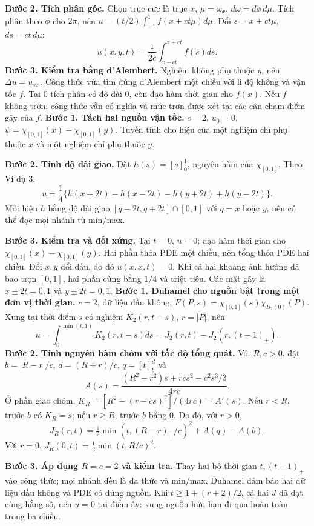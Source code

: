 \textbf{Bước 2. Tích phân góc.} Chọn trục cực là trục $x$, $\mu=\omega_x$, $d\omega=d\phi\,d\mu$. Tích phân theo $\phi$ cho $2\pi$, nên $u=(t/2)\int_{-1}^1f(x+ct\mu)d\mu$. Đổi $s=x+ct\mu$, $ds=ct\,d\mu$:
\[u(x,y,t)=\frac1{2c}\int_{x-ct}^{x+ct}f(s)ds.\]
\textbf{Bước 3. Kiểm tra bằng d'Alembert.} Nghiệm không phụ thuộc $y$, nên $\Delta u=u_{xx}$. Công thức vừa tìm đúng d'Alembert một chiều với li độ không và vận tốc $f$. Tại $0$ tích phân có độ dài $0$, còn đạo hàm thời gian cho $f(x)$. Nếu $f$ không trơn, công thức vẫn có nghĩa và mức trơn được xét tại các cận chạm điểm gãy của $f$.
\textbf{Bước 1. Tách hai nguồn vận tốc.} $c=2$, $u_0=0$, $\psi=\chi_{[0,1]}(x)-\chi_{[0,1]}(y)$. Tuyến tính cho hiệu của một nghiệm chỉ phụ thuộc $x$ và một nghiệm chỉ phụ thuộc $y$.

\textbf{Bước 2. Tính độ dài giao.} Đặt $h(s)=[s]_0^1$, nguyên hàm của $\chi_{[0,1]}$. Theo Ví dụ 3,
\[u=\frac14\{h(x+2t)-h(x-2t)-h(y+2t)+h(y-2t)\}.\]
Mỗi hiệu $h$ bằng độ dài giao $[q-2t,q+2t]\cap[0,1]$ với $q=x$ hoặc $y$, nên có thể đọc mọi nhánh từ min/max.

\textbf{Bước 3. Kiểm tra và đối xứng.} Tại $t=0$, $u=0$; đạo hàm thời gian cho $\chi_{[0,1]}(x)-\chi_{[0,1]}(y)$. Hai phần thỏa PDE một chiều, nên tổng thỏa PDE hai chiều. Đổi $x,y$ đổi dấu, do đó $u(x,x,t)=0$. Khi cả hai khoảng ảnh hưởng đã bao trọn $[0,1]$, hai phần cùng bằng $1/4$ và triệt tiêu. Các mặt gãy là $x\pm2t=0,1$ và $y\pm2t=0,1$.
\textbf{Bước 1. Duhamel cho nguồn bật trong một đơn vị thời gian.} $c=2$, dữ liệu đầu không, $F(P,s)=\chi_{[0,1]}(s)\chi_{B_2(0)}(P)$. Xung tại thời điểm $s$ có nghiệm $K_2(r,t-s)$, $r=|P|$, nên
\[u=\int_0^{\min(t,1)}K_2(r,t-s)ds=J_2(r,t)-J_2(r,(t-1)_+).\]
\textbf{Bước 2. Tính nguyên hàm chỏm với tốc độ tổng quát.} Với $R,c>0$, đặt $b=|R-r|/c$, $d=(R+r)/c$, $q=[t]_b^d$ và
\[A(s)=\frac{(R^2-r^2)s+rcs^2-c^2s^3/3}{4rc}.\]
Ở phần giao chỏm, $K_R=[R^2-(r-cs)^2]/(4rc)=A'(s)$. Nếu $r<R$, trước $b$ có $K_R=s$; nếu $r\ge R$, trước $b$ bằng $0$. Do đó, với $r>0$,
\[J_R(r,t)=\tfrac12\min(t,(R-r)_+/c)^2+A(q)-A(b).\]
Với $r=0$, $J_R(0,t)=\frac12\min(t,R/c)^2$.

\textbf{Bước 3. Áp dụng $R=c=2$ và kiểm tra.} Thay hai bộ thời gian $t,(t-1)_+$ vào công thức; mọi nhánh đều là đa thức và min/max. Duhamel đảm bảo hai dữ liệu đầu không và PDE có đúng nguồn. Khi $t\ge1+(r+2)/2$, cả hai $J$ đã đạt cùng hằng số, nên $u=0$ tại điểm ấy: xung nguồn hữu hạn đi qua hoàn toàn trong ba chiều.
